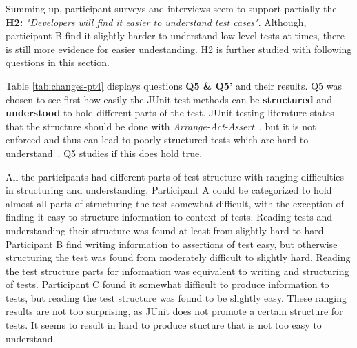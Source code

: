 Summing up, participant surveys and interviews seem to support partially the \textbf{H2:} \textit{"Developers will find it easier to understand test cases"}.
Although, participant B find it slightly harder to understand low-level tests at times, there is still more evidence for
easier undestanding. H2 is further studied with following questions in this section.

Table \ref{tab:changes-pt4} displays questions \textbf{Q5 \& Q5'} and their results. Q5 was chosen to see first
how easily the JUnit test methods can be \textbf{structured} and \textbf{understood} to hold different parts of the test. JUnit testing literature states that
the structure should be done with \textit{Arrange-Act-Assert}~\cite{langr2015pragmatic}, but it is not enforced and thus can lead to poorly structured
tests which are hard to understand~\cite{kapelonis2016java}. Q5 studies if this does hold true.

All the participants had different parts of test
structure with ranging difficulties in structuring and understanding. Participant A could be categorized to hold almost all
parts of structuring the test somewhat difficult, with the exception of finding it easy to structure information to context of tests.
Reading tests and understanding their structure was found at least from slightly hard to hard.
Participant B find writing information to assertions of test easy, but otherwise structuring the test
was found from moderately difficult to slightly hard. Reading the test structure parts for information was equivalent
to writing and structuring of tests. Participant C found it somewhat difficult to produce information
to tests, but reading the test structure was found to be slightly easy. These ranging results are not too surprising,
as JUnit does not promote a certain structure for tests. It seems to result in hard to produce stucture that is not
too easy to understand.

